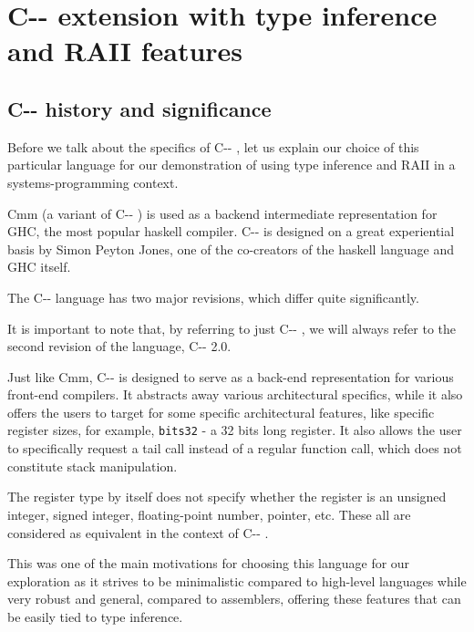 \providecommand{\cmm}[0]{ C-{}- }

\chapter{\cmm extension with type inference and RAII features}

\label{chap2}



\section{\cmm history and significance}

Before we talk about the specifics of \cmm, let us explain our choice of this particular language for our demonstration of using type inference and RAII in a systems-programming context.

Cmm (a variant of \cmm) is used as a backend intermediate representation for GHC, the most popular haskell compiler. \cmm is designed on a great experiential basis by Simon Peyton Jones, one of the co-creators of the haskell language and GHC itself.

\begin{remark}
    The \cmm language has two major revisions, which differ quite significantly.

    It is important to note that, by referring to just \cmm, we will always refer to the second revision of the language, \cmm 2.0.
\end{remark}

Just like Cmm, \cmm is designed to serve as a back-end representation for various front-end compilers. It abstracts away various architectural specifics, while it also offers the users to target for some specific architectural features, like specific register sizes, for example, \lstinline{bits32} - a 32 bits long register. It also allows the user to specifically request a tail call instead of a regular function call, which does not constitute stack manipulation.

The register type by itself does not specify whether the register is an unsigned integer, signed integer, floating-point number, pointer, etc. These all are considered as equivalent in the context of \cmm.

This was one of the main motivations for choosing this language for our exploration as it strives to be minimalistic compared to high-level languages while very robust and general, compared to assemblers, offering these features that can be easily tied to type inference.

